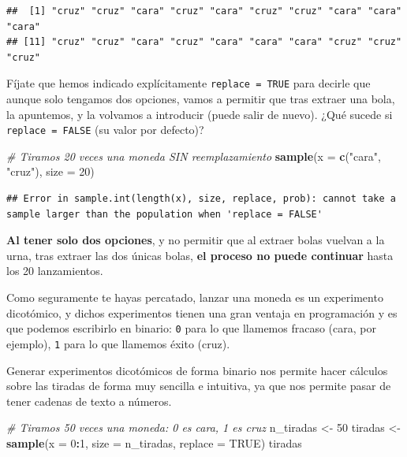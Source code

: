 \documentclass[11pt,]{book}
\newenvironment{Shaded}{\begin{snugshade}}{\end{snugshade}}
\newcommand{\CommentTok}[1]{\textcolor[rgb]{0.37,0.37,0.37}{\textit{#1}}}
\newcommand{\DataTypeTok}[1]{\textcolor[rgb]{0.27,0.27,0.27}{#1}}
\newcommand{\DecValTok}[1]{\textcolor[rgb]{0.06,0.06,0.06}{#1}}
\newcommand{\KeywordTok}[1]{\textcolor[rgb]{0.27,0.27,0.27}{\textbf{#1}}}
\newcommand{\NormalTok}[1]{#1}
\newcommand{\OperatorTok}[1]{\textcolor[rgb]{0.43,0.43,0.43}{\textbf{#1}}}
\newcommand{\OtherTok}[1]{\textcolor[rgb]{0.37,0.37,0.37}{#1}}
\newcommand{\StringTok}[1]{\textcolor[rgb]{0.5,0.5,0.5}{#1}}
\begin{document}
\begin{verbatim}
##  [1] "cruz" "cruz" "cara" "cruz" "cara" "cruz" "cruz" "cara" "cara" "cara"
## [11] "cruz" "cruz" "cara" "cruz" "cara" "cara" "cara" "cruz" "cruz" "cruz"
\end{verbatim}

Fíjate que hemos indicado explícitamente \texttt{replace\ =\ TRUE} para decirle que aunque solo tengamos dos opciones, vamos a permitir que tras extraer una bola, la apuntemos, y la volvamos a introducir (puede salir de nuevo). ¿Qué sucede si \texttt{replace\ =\ FALSE} (su valor por defecto)?

\begin{Shaded}
\begin{Highlighting}[]
\CommentTok{# Tiramos 20 veces una moneda SIN reemplazamiento}
\KeywordTok{sample}\NormalTok{(}\DataTypeTok{x =} \KeywordTok{c}\NormalTok{(}\StringTok{"cara"}\NormalTok{, }\StringTok{"cruz"}\NormalTok{), }\DataTypeTok{size =} \DecValTok{20}\NormalTok{)}
\end{Highlighting}
\end{Shaded}

\begin{verbatim}
## Error in sample.int(length(x), size, replace, prob): cannot take a sample larger than the population when 'replace = FALSE'
\end{verbatim}

\textbf{Al tener solo dos opciones}, y no permitir que al extraer bolas vuelvan a la urna, tras extraer las dos únicas bolas, \textbf{el proceso no puede continuar} hasta los 20 lanzamientos.

Como seguramente te hayas percatado, lanzar una moneda es un experimento dicotómico, y dichos experimentos tienen una gran ventaja en programación y es que podemos escribirlo en binario: \texttt{0} para lo que llamemos fracaso (cara, por ejemplo), \texttt{1} para lo que llamemos éxito (cruz).

Generar experimentos dicotómicos de forma binario nos permite hacer cálculos sobre las tiradas de forma muy sencilla e intuitiva, ya que nos permite pasar de tener cadenas de texto a números.

\begin{Shaded}
\begin{Highlighting}[]
\CommentTok{# Tiramos 50 veces una moneda: 0 es cara, 1 es cruz}
\NormalTok{n_tiradas <-}\StringTok{ }\DecValTok{50}
\NormalTok{tiradas <-}\StringTok{ }\KeywordTok{sample}\NormalTok{(}\DataTypeTok{x =} \DecValTok{0}\OperatorTok{:}\DecValTok{1}\NormalTok{, }\DataTypeTok{size =}\NormalTok{ n_tiradas, }\DataTypeTok{replace =} \OtherTok{TRUE}\NormalTok{)}
\NormalTok{tiradas}
\end{Highlighting}
\end{Shaded}
\end{document}
